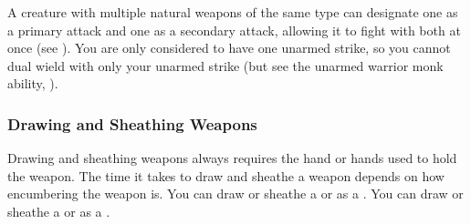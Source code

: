             A creature with multiple natural weapons of the same type can designate one as a primary attack and one as a secondary attack, allowing it to fight with both at once (see ). You are only considered to have one unarmed strike, so you cannot dual wield with only your unarmed strike (but see the unarmed warrior monk ability, ).

        \subsubsection{Drawing and Sheathing Weapons}\label{Drawing and Sheathing Weapons}
            Drawing and sheathing weapons always requires the hand or hands used to hold the weapon.
            The time it takes to draw and sheathe a weapon depends on how encumbering the weapon is.
            You can draw or sheathe a  or  as a .
            You can draw or sheathe a  or  as a .

